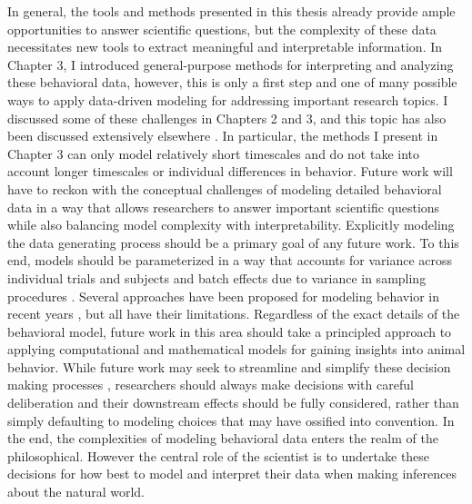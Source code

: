In general, the tools and methods presented in this thesis already provide ample opportunities to answer scientific questions, but the complexity of these data necessitates new tools to extract meaningful and interpretable information. In Chapter 3, I introduced general-purpose methods for interpreting and analyzing these behavioral data, however, this is only a first step and one of many possible ways to apply data-driven modeling for addressing important research topics. I discussed some of these challenges in Chapters 2 and 3, and this topic has also been discussed extensively elsewhere \citep{brown2018ethology, berman2018measuring, datta2019computational}. In particular, the methods I present in Chapter 3 can only model relatively short timescales and do not take into account longer timescales or individual differences in behavior. Future work will have to reckon with the conceptual challenges of modeling detailed behavioral data in a way that allows researchers to answer important scientific questions while also balancing model complexity with interpretability. Explicitly modeling the data generating process should be a primary goal of any future work. To this end, models should be parameterized in a way that accounts for variance across individual trials and subjects \citep{pandarinath2018lfads} and batch effects due to variance in sampling procedures \citep{ding2019deep}. Several approaches have been proposed for modeling behavior in recent years \citep{berman2014mapping, berman2016predictability, wiltschko2015mapping, Costa1501, johnson2016composing, markowitz2018striatum}, but all have their limitations. Regardless of the exact details of the behavioral model, future work in this area should take a principled approach to applying computational and mathematical models for gaining insights into animal behavior. While future work may seek to streamline and simplify these decision making processes \citep{keshtkaran2021large}, researchers should always make decisions with careful deliberation and their downstream effects should be fully considered, rather than simply defaulting to modeling choices that may have ossified into convention. In the end, the complexities of modeling behavioral data enters the realm of the philosophical. However the central role of the scientist is to undertake these decisions for how best to model and interpret their data when making inferences about the natural world.   

